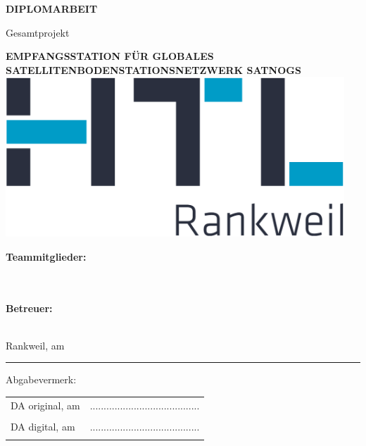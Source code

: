 \documentclass[hidelinks,12pt,a4paper,twoside]{report}
\begin{document}
	\begin{center}
		\textbf {\huge {\uppercase {Diplomarbeit}}}
		\par \large {Gesamtprojekt}
		\par \textbf {\huge {\uppercase {Empfangsstation für globales Satellitenbodenstationsnetzwerk SatNOGS}}}
		\vspace{0.3cm}
		\linebreak
		\includegraphics[frame, height=6cm]{../ref/HTL_Rankweil_logo.png}
	\end{center}
	
	\vfill %
	
	
	\begin{minipage}[t] {0.4\textwidth}
		\textbf{Teammitglieder:} \\
		\emplLastA \\
		\emplLastB \\
	\end{minipage}
	\begin{minipage}[t] {0.4\textwidth}
		\textbf{Betreuer:} \\		
		\supervisor \\
	\end{minipage}
	
	\par Rankweil, am \PrintDate \\		
	
	\noindent\rule{\textwidth}{0.4pt}
	Abgabevermerk:
	\linebreak
	
	\begin{tabular}{p{7cm}C{6cm}}
		\hspace{1cm} DA original, am \PrintDate & ........................................ \\ 
		& \supervisor \\ [2.5em]
		
		\hspace{1cm} DA digital, am \PrintDate & ........................................ \\ 
		& \supervisor \\
	\end{tabular}
	
\end{document}

